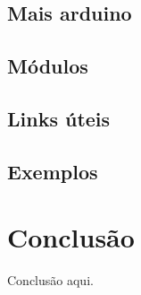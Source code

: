 \documentclass{article}
\begin{document}
\subsection{Mais arduino}

\subsection{Módulos}

\subsection{Links úteis}
%

\subsection{Exemplos}



\section{Conclusão}
Conclusão aqui.
\end{document}
